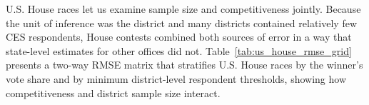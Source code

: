 \documentclass[12pt]{article}
\begin{document}
U.S. House races let us examine sample size and competitiveness jointly. Because the unit of inference was the district and many districts contained relatively few CES respondents, House contests combined both sources of error in a way that state-level estimates for other offices did not. Table~\ref{tab:us_house_rmse_grid} presents a two-way RMSE matrix that stratifies U.S. House races by the winner's vote share and by minimum district-level respondent thresholds, showing how competitiveness and district sample size interact.


\end{document}
